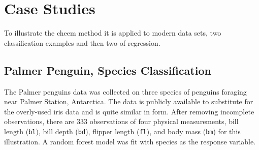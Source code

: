 \documentclass[
]{jss}
\begin{document}
\hypertarget{sec:casestudies}{%
\section{Case Studies}\label{sec:casestudies}}

To illustrate the cheem method it is applied to modern data sets, two
classification examples and then two of regression.

\hypertarget{palmer-penguin-species-classification}{%
\subsection{Palmer Penguin, Species
Classification}\label{palmer-penguin-species-classification}}

The Palmer penguins data
\citep{gorman_ecological_2014, horst_palmerpenguins_2020} was collected
on three species of penguins foraging near Palmer Station, Antarctica.
The data is publicly available to substitute for the overly-used iris
data and is quite similar in form. After removing incomplete
observations, there are 333 observations of four physical measurements,
bill length (\texttt{bl}), bill depth (\texttt{bd}), flipper length
(\texttt{fl}), and body mass (\texttt{bm}) for this illustration. A
random forest model was fit with species as the response variable.
\end{document}
